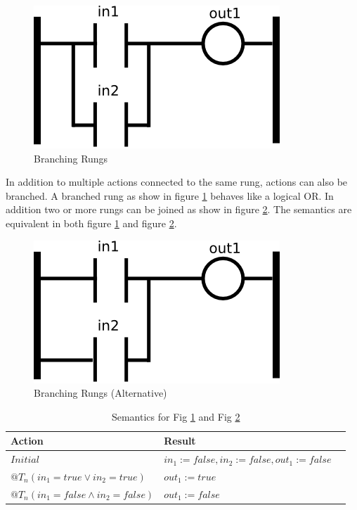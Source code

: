\begin{figure}[h]
    \centering
    \includegraphics[width=\imgsmall]{./images/intro_fig3.png}
    \caption{Branching Rungs}
    \label{fig:intro_fig3}
\end{figure}


In addition to multiple actions connected to the same rung, actions can also be branched. A branched rung as
show in figure \ref{fig:intro_fig3} behaves like a logical OR. In addition two or more rungs can be joined
as show in figure \ref{fig:intro_fig3a}. The semantics are equivalent in both figure \ref{fig:intro_fig3} and 
figure \ref{fig:intro_fig3a}.

\begin{figure}[h]
    \centering
    \includegraphics[width=\imgsmall]{./images/intro_fig3a.png}
    \caption{Branching Rungs (Alternative)}
    \label{fig:intro_fig3a}
\end{figure}

\begin{table}[h]
    \centering
       \begin{tabular}{|l|l|l|}
        \hline
        Action & Result \\
        \hline
        $Initial$ & $in_1 := false, in_2 := false, out_1 := false$\\
        \hline
        $@T_n(in_1 = true \vee in_2 = true)$ & $out_1 := true$ \\
        \hline
        $@T_n(in_1 = false \wedge in_2 = false)$ & $out_1 := false$\\
        \hline
    \end{tabular}
    \caption{Semantics for Fig \ref{fig:intro_fig3} and Fig \ref{fig:intro_fig3a}}
    \label{table:table_for_fig3}
\end{table}

